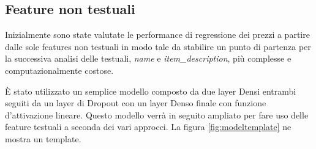



\subsection{Feature non testuali}

Inizialmente sono state valutate le performance di regressione dei prezzi a
partire dalle sole features non testuali in modo tale da stabilire un punto di
partenza per la successiva analisi delle testuali, \textit{name} e
\textit{item\_description}, più complesse e computazionalmente costose.

È stato utilizzato un semplice modello composto da due layer Densi entrambi
seguiti da un layer di Dropout con un layer Denso finale con funzione d'attivazione lineare.
Questo modello verrà in seguito ampliato per fare uso delle feature
testuali a seconda dei vari approcci.
La figura \ref{fig:modeltemplate} ne mostra un template.

